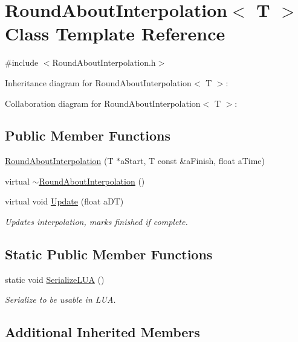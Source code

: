 \hypertarget{classRoundAboutInterpolation}{}\section{Round\+About\+Interpolation$<$ T $>$ Class Template Reference}
\label{classRoundAboutInterpolation}


{\ttfamily \#include $<$Round\+About\+Interpolation.\+h$>$}



Inheritance diagram for Round\+About\+Interpolation$<$ T $>$\+:


Collaboration diagram for Round\+About\+Interpolation$<$ T $>$\+:
\subsection*{Public Member Functions}
\begin{DoxyCompactItemize}
\item 
\hyperlink{classRoundAboutInterpolation_af6bacb4211403c85b1d74f299fa26654}{Round\+About\+Interpolation} (T $\ast$a\+Start, T const \&a\+Finish, float a\+Time)
\item 
virtual \hyperlink{classRoundAboutInterpolation_aa7ea0cc79445d2098b404f9e136bdba1}{$\sim$\+Round\+About\+Interpolation} ()
\item 
virtual void \hyperlink{classRoundAboutInterpolation_a136325b1ca228189f58dfc1d0d3ff8ce}{Update} (float a\+DT)
\begin{DoxyCompactList}\small\item\em Updates interpolation, marks finished if complete. \end{DoxyCompactList}\end{DoxyCompactItemize}
\subsection*{Static Public Member Functions}
\begin{DoxyCompactItemize}
\item 
static void \hyperlink{classRoundAboutInterpolation_ad29a2d2f93d5f92d8d056dcdb4e0901c}{Serialize\+L\+UA} ()
\begin{DoxyCompactList}\small\item\em Serialize to be usable in L\+UA. \end{DoxyCompactList}\end{DoxyCompactItemize}
\subsection*{Additional Inherited Members}


